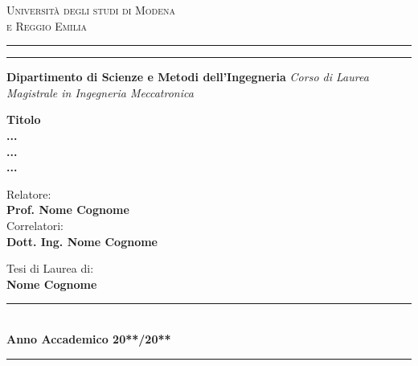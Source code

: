 \begin{titlepage}
	\begin{center}
		{{\Large{\textsc{Università  degli studi di Modena \\e Reggio Emilia}}}} \rule[0.1cm]{15cm}{0.1mm}
		\rule[0.5cm]{15cm}{0.6mm}
		{\Large{\bf Dipartimento di Scienze e Metodi dell'Ingegneria}}
		\large{\itshape{Corso di Laurea Magistrale in Ingegneria Meccatronica}}
	\end{center}
	\vspace{20mm}
	\begin{center}
		{\Huge{\bf Titolo}}\\
		\vspace{5mm}
		{\Huge{\bf  ... }}\\
		\vspace{6mm}
		{\Huge{\bf  ... }}\\
		\vspace{5mm}
		{\Huge{\bf ... }}\\
	\end{center}
	\vfill
	\noindent
	\begin{minipage}[t]{0.52\textwidth}
		{\large Relatore: \\
		{\bf Prof. Nome Cognome} \vspace{\baselineskip} \\ 
		Correlatori: \\
		{\bf Dott. Ing. Nome Cognome}}
	\end{minipage}
	\hfill
	\begin{minipage}[t]{0.47\textwidth}\raggedleft
		{\large Tesi di Laurea di: \\
		{\bf Nome Cognome}}
	\end{minipage}
	\vspace{15mm}
	\begin{center}
		\rule[0.5cm]{10cm}{0.6mm} \\
		{\large{\bf Anno Accademico 20**/20**}}\\
		\vspace{7 mm}
		\rule[0.5cm]{10cm}{0.6mm}\\
	\end{center}
\end{titlepage}